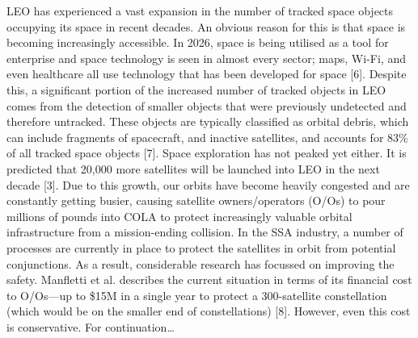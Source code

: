 LEO has experienced a vast expansion in the number of tracked space objects occupying its space in recent decades. An obvious reason for this is that space is becoming increasingly accessible. In 2026, space is being utilised as a tool for enterprise and space technology is seen in almost every sector; maps, Wi-Fi, and even healthcare all use technology that has been developed for space [6]. Despite this, a significant portion of the increased number of tracked objects in LEO comes from the detection of smaller objects that were previously undetected and therefore untracked. These objects are typically classified as orbital debris, which can include fragments of spacecraft, and inactive satellites, and accounts for 83\% of all tracked space objects [7]. Space exploration has not peaked yet either. It is predicted that 20,000 more satellites will be launched into LEO in the next decade [3]. 
Due to this growth, our orbits have become heavily congested and are constantly getting busier, causing satellite owners/operators (O/Os) to pour millions of pounds into COLA to protect increasingly valuable orbital infrastructure from a mission-ending collision. In the SSA industry, a number of processes are currently in place to protect the satellites in orbit from potential conjunctions. As a result, considerable research has focussed on improving the safety. Manfletti et al. describes the current situation in terms of its financial cost to O/Os—up to \$15M in a single year to protect a 300-satellite constellation (which would be on the smaller end of constellations) [8]. However, even this cost is conservative. 
For continuation…
